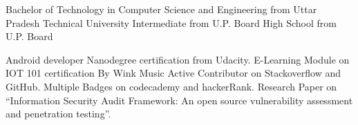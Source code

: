 %
%
%


\begin{scholarship}
					{Bachelor of Technology in Computer Science and Engineering from Uttar Pradesh Technical University}
					{Intermediate from U.P. Board}
					{High School from U.P. Board}
\end{scholarship}


\begin{scholarship}
					{Android developer Nanodegree certification from Udacity.}
					{E-Learning Module on IOT 101 certification By Wink Music}
	\scholarshipentry{}
					{Active Contributor on Stackoverflow and GitHub.}
	\scholarshipentry{}
					{Multiple Badges on codecademy and hackerRank.}
                    {Research Paper on “Information Security Audit Framework: An open source vulnerability assessment and penetration testing”.}

	
\end{scholarship}